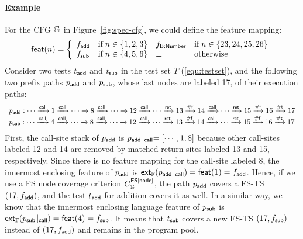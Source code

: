 \paragraph{\textbf{Example}}
%
For the CFG $\mathbb{G}$ in Figure~\ref{fig:spec-cfg}, we could define the
feature mapping:
\begin{equation}\label{equ:featmap}
  \textsf{feat}(n) = \left\{
    \begin{array}{llll}
      f_{\textsf{add}} & \text{if} \; n \in \{ 1, 2, 3\} &
      f_{\textsf{B:Number}} & \text{if} \; n \in \{ 23, 24, 25, 26 \} \\

      f_{\textsf{sub}} & \text{if} \; n \in \{ 4, 5, 6\} &
      \bot & \text{otherwise}
    \end{array}
  \right.
\end{equation}
%
Consider two tests $t_{\textsf{add}}$ and $t_{\textsf{sub}}$ in the test set $T$
(\ref{equ:testset}), and the following two prefix paths $p_{\textsf{add}}$ and $p_{\textsf{sub}}$,
whose last nodes are labeled 17, of their execution paths:
%
\[
  \begin{array}{l}
    p_{\textsf{add}}: \cdots \xrightarrow{\textsf{call}} 1 \xrightarrow{\textsf{call}} \cdots \xrightarrow{} 8 \xrightarrow{\textsf{call}} \cdots \xrightarrow{} 12 \xrightarrow{\textsf{call}}
    \cdots \xrightarrow{\textsf{ret}} 13 \xrightarrow{\textsf{\#f}} 14 \xrightarrow{\textsf{call}} \cdots \xrightarrow{\textsf{ret}} 15 \xrightarrow{\textsf{\#f}} 16 \xrightarrow{\textsf{\#t}} 17\\

    p_{\textsf{sub}}:\cdots \xrightarrow{\textsf{call}} 4 \xrightarrow{\textsf{call}} \cdots \xrightarrow{} 8 \xrightarrow{\textsf{call}} \cdots \xrightarrow{} 12 \xrightarrow{\textsf{call}}
    \cdots \xrightarrow{\textsf{ret}} 13 \xrightarrow{\textsf{\#f}} 14 \xrightarrow{\textsf{call}} \cdots \xrightarrow{\textsf{ret}} 15 \xrightarrow{\textsf{\#f}} 16 \xrightarrow{\textsf{\#t}} 17\\
  \end{array}
\]
%
First, the call-site stack of $p_{\textsf{add}}$ is ${p_{\textsf{add}}}\!\mid_{\textsf{call}} = [\cdots, 1, 8]$
because other call-sites labeled 12 and 14 are removed by matched return-sites
labeled 13 and 15, respectively.
%
Since there is no feature mapping for the call-site labeled 8, the innermost enclosing
feature of $p_{\textsf{add}}$ is $\textsf{ext}_{\mathbb{F}}({p_{\textsf{add}}}\!\mid_{\textsf{call}}) = \textsf{feat}(1) =
f_{\textsf{add}}$.
%
Hence, if we use a FS node coverage criterion $C_{\mathbb{G}}^{\textsf{FS}[\textsf{node}]}$, the path
$p_{\textsf{add}}$ covers a FS-TS $(17, f_{\textsf{add}})$, and the test $t_{\textsf{add}}$ for addition
covers it as well.
%
In a similar way, we know that the innermost enclosing language feature of $p_{\textsf{sub}}$
is $\textsf{ext}_{\mathbb{F}}({p_{\textsf{sub}}}\!\mid_{\textsf{call}}) = \textsf{feat}(4) = f_{\textsf{sub}}$.
%
It means that $t_{\textsf{sub}}$ covers a new FS-TS $(17, f_{\textsf{sub}})$ instead of $(17,
f_{\textsf{add}})$ and remains in the program pool.


